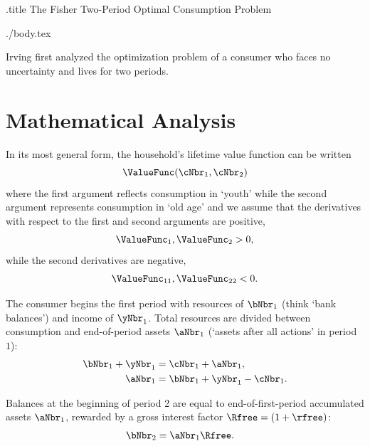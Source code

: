 \documentclass{handout}
\begin{document}
\handoutHeader

\begin{verbatimwrite}{\jobname.title}
  The Fisher Two-Period Optimal Consumption Problem
\end{verbatimwrite}

\handoutNameMake

\begin{verbatimwrite}{./body.tex}

  Irving \cite{fisherInterestTheory} first analyzed the optimization
  problem of a consumer who faces no uncertainty and lives for two
  periods.  

  \section{Mathematical Analysis}

  In its most general form, the household's lifetime value function can be written
  \[
    \ValueFunc(\cNbr_{1},\cNbr_{2})
  \]
  where the first argument reflects consumption in `youth' while the second argument represents consumption in `old age' and we assume that the derivatives with respect to the first and
  second arguments are positive,
  \begin{equation}
    \ValueFunc_{1}, \ValueFunc_{2} > 0, \label{eq:uprimepos}
  \end{equation}
  while the second derivatives are negative,
  \begin{equation}
    \ValueFunc_{11}, \ValueFunc_{22}<0 \label{eq:uprimeprimeneg}.
  \end{equation}

  The consumer begins the first period with resources of $\bNbr_{1}$ (think
  `bank balances') and income of $\yNbr_{1}$.  Total resources are divided between consumption
  and end-of-period assets $\aNbr_{1}$ (`assets after all actions' in period ${1}$):
  \begin{equation}\begin{gathered}\begin{aligned}
        \bNbr_{1}+\yNbr_{1} & =  \cNbr_{1}+\aNbr_{1},
        \\ \aNbr_{1} & =  \bNbr_{1}+\yNbr_{1}-\cNbr_{1}.
      \end{aligned}\end{gathered}\end{equation}

  Balances at the beginning of period 2 are equal to end-of-first-period
  accumulated assets $\aNbr_{1}$, rewarded by a gross interest factor $\Rfree = (1+\rfree)$:
  \begin{equation}\begin{gathered}\begin{aligned}
        \bNbr_{2} & =  \aNbr_{1}\Rfree.
      \end{aligned}\end{gathered}\end{equation}


\end{verbatimwrite}
\end{document}
